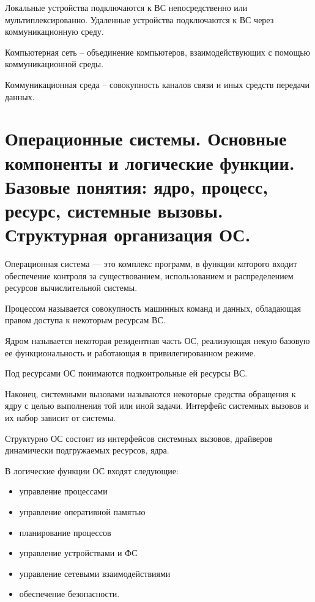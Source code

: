 \documentclass[a4paper,12pt,titlepage,finall]{article}
\begin{document}
Локальные устройства подключаются к ВС непосредственно или мультиплексированно. Удаленные устройства подключаются к ВС через коммуникационную среду.

Компьютерная сеть -- объединение компьютеров, взаимодействующих с помощью коммуникационной среды.

Коммуникационная среда -- совокупность каналов связи и иных средств передачи данных.
\section{Операционные системы. Основные компоненты и логические функции. Базовые понятия: ядро,
процесс, ресурс, системные вызовы. Структурная организация ОС.}
Операционная система — это комплекс программ, в функции которого входит обеспечение контроля за существованием, использованием и распределением ресурсов вычислительной системы.

Процессом называется совокупность машинных команд и данных, обладающая правом доступа к некоторым ресурсам ВС.

Ядром называется некоторая резидентная часть ОС, реализующая некую базовую ее функциональность и работающая в привилегированном режиме.

Под ресурсами ОС понимаются подконтрольные ей ресурсы ВС.

Наконец, системными вызовами называются некоторые средства обращения к ядру с целью выполнения той или иной задачи. Интерфейс системных вызовов и их набор зависит от системы.

Структурно ОС состоит из интерфейсов системных вызовов, драйверов динамически подгружаемых ресурсов, ядра.

В логические функции ОС входят следующие:
\begin{itemize}
    \item управление процессами
    \item управление оперативной памятью
    \item планирование процессов
    \item управление устройствами и ФС
    \item управление сетевыми взаимодействиями
    \item обеспечение безопасности.
\end{itemize}
\end{document}
